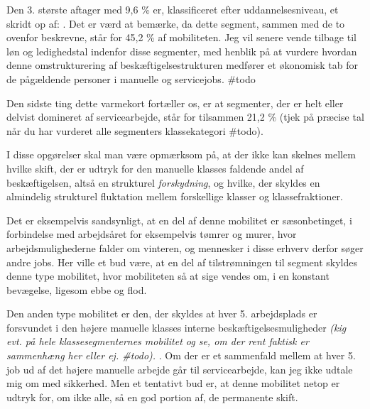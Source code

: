 \begin{landscape}
Den 3. største aftager med 9,6 \% er, klassificeret efter uddannelsesniveau, et skridt op af: . Det er værd at bemærke, da dette segment, sammen med de to ovenfor beskrevne, står for 45,2 \% af mobiliteten. Jeg vil senere vende tilbage til løn og ledighedstal indenfor disse segmenter, med henblik på at vurdere hvordan denne omstrukturering af beskæftigelsestrukturen medfører et økonomisk tab for de pågældende personer i manuelle og servicejobs.  \#todo

Den sidste ting dette varmekort fortæller os, er at segmenter, der er helt eller delvist domineret af servicearbejde, står for tilsammen 21,2 \% (tjek på præcise tal når du har vurderet alle segmenters klassekategori \#todo). 

I disse opgørelser skal man være opmærksom på, at der ikke kan skelnes mellem hvilke skift, der er udtryk for den manuelle klasses faldende andel af beskæftigelsen, altså en strukturel \emph{forskydning}, og hvilke, der skyldes en almindelig strukturel fluktation mellem forskellige klasser og klassefraktioner. 

Det er eksempelvis sandsynligt, at en del af denne mobilitet er sæsonbetinget, i forbindelse med arbejdsåret for eksempelvis tømrer og murer, hvor arbejdsmulighederne falder om vinteren, og mennesker i disse erhverv derfor søger andre jobs. Her ville et bud være, at en del af tilstrømningen til segment  skyldes denne type mobilitet, hvor mobiliteten så at sige vendes om, i en konstant bevægelse, ligesom ebbe og flod.

Den anden type mobilitet er den, der skyldes at hver 5. arbejdsplads er forsvundet i den højere manuelle klasses interne beskæftigelsesmuligheder \emph{(kig evt. på hele klassesegmenternes mobilitet og se, om der rent faktisk er sammenhæng her eller ej. \#todo). }. Om der er et sammenfald mellem at hver 5. job ud af det højere manuelle arbejde går til servicearbejde, kan jeg ikke udtale mig om med sikkerhed. Men et tentativt bud er, at denne mobilitet netop er udtryk for, om ikke alle, så en god portion af, de permanente skift.







\end{landscape}
